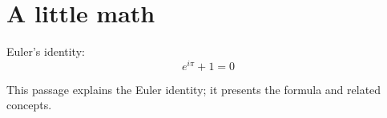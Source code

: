 \section{A little math}

Euler's identity:
\[
  e^{i\pi} + 1 = 0
\]

This passage explains the Euler identity; it presents the formula and related concepts.

